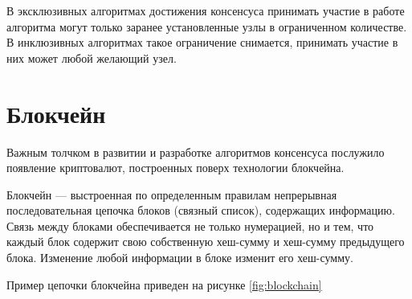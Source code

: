             В эксклюзивных алгоритмах достижения консенсуса принимать участие в работе алгоритма могут только заранее установленные узлы в ограниченном количестве. В инклюзивных алгоритмах такое ограничение снимается, принимать участие в них может любой желающий узел.
    
    \section{Блокчейн}
    
        Важным толчком в развитии и разработке алгоритмов консенсуса послужило появление криптовалют, построенных поверх технологии блокчейна.
        
        Блокчейн --- выстроенная по определенным правилам непрерывная последовательная цепочка блоков (связный список), содержащих информацию. Связь между блоками обеспечивается не только нумерацией, но и тем, что каждый блок содержит свою собственную хеш-сумму и хеш-сумму предыдущего блока. Изменение любой информации в блоке изменит его хеш-сумму.
        
        Пример цепочки блокчейна приведен на рисунке \ref{fig:blockchain}
        
